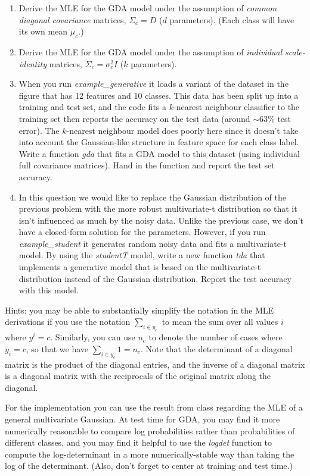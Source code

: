 \documentclass{article}
\def\blu#1{{\color{blu}#1}}
\def\enum#1{\begin{enumerate}#1\end{enumerate}}
\begin{document}
\enum{
\item \blu{Derive the MLE for the GDA model under the assumption of \emph{common diagonal covariance} matrices}, $\Sigma_c = D$ ($d$ parameters). (Each class will have its own mean $\mu_c$.)
\item \blu{Derive the MLE for the GDA model under the assumption of \emph{individual scale-identity} matrices}, $\Sigma_c = \sigma_c^2 I$ ($k$ parameters).
\item When you run \emph{example\_generative} it loads a variant of the dataset in the figure that has 12 features and 10 classes. This data has been split up into a training and test set, and the code fits a $k$-nearest neighbour classifier to the training set then reports the accuracy on the test data (around $\sim 63\%$ test error). The $k$-nearest neighbour model does poorly here since it doesn't take into account the Gaussian-like structure in feature space for each class label. Write a function \emph{gda} that fits a GDA model to this dataset (using individual full covariance matrices). \blu{Hand in the function and report the test set accuracy}.
\item In this question we would like to replace the Gaussian distribution of the previous problem with the more robust multivariate-t distribution so that it isn't influenced as much by the noisy data.
Unlike the previous case, we don't have a closed-form solution for the parameters. However, if you run \emph{example\_student} it generates random noisy data and fits a multivariate-t model. By using the \emph{studentT} model, write a new function \emph{tda} that implements a generative model that is based on the multivariate-t distribution instead of the Gaussian distribution. \blu{Report the test accuracy  with this model.}
}
Hints: you may be able to substantially simplify the notation in the MLE derivations if you use the notation $\sum_{i \in y_c}$ to mean the sum over all values $i$ where $y^i = c$. Similarly, you can use $n_c$ to denote the number of cases where $y_i = c$, so that we have $\sum_{i \in y_c}1 = n_c$. Note that the determinant of a diagonal matrix is the product of the diagonal entries, and the inverse of a diagonal matrix is a diagonal matrix with the reciprocals of the original matrix along the diagonal. 

For the implementation you can use the result from class regarding the MLE of a general multivariate Gaussian. At test time for GDA, you may find it more numerically reasonable to compare log probabilities rather than probabilities of different classes, and you may find it helpful to use the \emph{logdet}  function to compute the log-determinant in a more numerically-stable way than taking the log of the determinant. (Also, don't forget to center at training and test time.)
\end{document}
